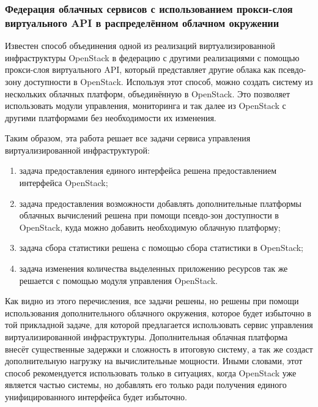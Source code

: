 \subsubsection{Федерация облачных сервисов с использованием прокси-слоя виртуального API в распределённом облачном окружении}
Известен способ объединения одной из реализаций виртуализированной инфраструктуры OpenStack в федерацию с другими реализациями с помощью прокси-слоя виртуального API, который представляет другие облака как псевдо-зону доступности в OpenStack\cite{federated-cloud-services}.
Используя этот способ, можно создать систему из нескольких облачных платформ, объединённую в OpenStack. Это позволяет использовать модули управления, мониторинга и так далее из OpenStack с другими платформами без необходимости их изменения.

Таким образом, эта работа решает все задачи сервиса управления виртуализированной инфраструктурой:
\begin{enumerate}
    \item задача предоставления единого интерфейса решена предоставлением интерфейса OpenStack;
    \item задача предоставления возможности добавлять дополнительные платформы облачных вычислений решена при помощи псевдо-зон доступности в OpenStack, куда можно добавить необходимую облачную платформу;
    \item задача сбора статистики решена с помощью сбора статистики в OpenStack;
    \item задача изменения количества выделенных приложению ресурсов так же решается с помощью модуля управления OpenStack.
\end{enumerate}
Как видно из этого перечисления, все задачи решены, но решены при помощи использования дополнительного облачного окружения, которое будет избыточно в той прикладной задаче, для которой предлагается использовать сервис управления виртуализированной инфраструктуры.
Дополнительная облачная платформа внесёт существенные задержки и сложность в итоговую систему, а так же создаст дополнительную нагрузку на вычислительные мощности.
Иными словами, этот способ рекомендуется использовать только в ситуациях, когда OpenStack уже является частью системы, но добавлять его только ради получения единого унифицированного интерфейса будет избыточно.